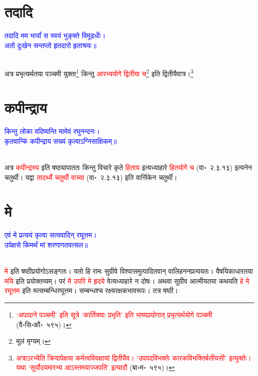 \section[तदादि]{तदादि}
\centering\textcolor{blue}{तदादि मम भार्यां स स्वयं भुङ्क्ते विमूढधीः।\nopagebreak\\
अतो दुःखेन सन्तप्तो हृतदारो हृताश्रयः॥}\nopagebreak\\
\\
\begin{sloppypar}\justifying\noindent\hspace{10mm} अत्र प्रभृत्यर्थतया पञ्चमी युक्ता\footnote{\textcolor{red}{‘अपादाने पञ्चमी’ इति सूत्रे ‘कार्तिक्याः प्रभृति’ इति भाष्य\-प्रयोगात् प्रभृत्यर्थयोगे पञ्चमी} (वै॰सि॰कौ॰~५९५)।} किन्तु \textcolor{red}{आरभ्य\-योगे द्वितीया च}\footnote{मूलं मृग्यम्।} इति द्वितीयैवात्र।\footnote{\textcolor{red}{अत्राऽरभ्येति क्रियापेक्षया कर्मत्वविवक्षायां द्वितीयैव। ‘उपपदविभक्तेः कारकविभक्तिर्बलीयसी’ इत्युक्तेः। यथा ‘सूर्योदयमारभ्य आऽस्तमयाज्जपति’ इत्यादौ} (बा॰म॰~५९५)।}\end{sloppypar}
\section[कपीन्द्राय]{कपीन्द्राय}
\centering\textcolor{blue}{किन्तु लोका वदिष्यन्ति मामेवं रघुनन्दनः।\nopagebreak\\
कृतवान्किं कपीन्द्राय सख्यं कृत्वाऽग्निसाक्षिकम्॥}\nopagebreak\\
\\
\begin{sloppypar}\justifying\noindent\hspace{10mm}
अत्र \textcolor{red}{कपीन्द्रस्य} इति षष्ठ्यापाततः किन्तु विचारे कृते \textcolor{red}{हिताय} इत्यध्याहारे \textcolor{red}{हित\-योगे च} (वा॰~२.३.१३) इत्यनेन चतुर्थी। यद्वा \textcolor{red}{तादर्थ्ये चतुर्थी वाच्या} (वा॰~२.३.१३) इति वार्त्तिकेन चतुर्थी।\end{sloppypar}
\section[मे]{मे}
\centering\textcolor{blue}{एवं मे प्रत्ययं कृत्वा सत्यवादिन् रघूत्तम।\nopagebreak\\
उपेक्षसे किमर्थं मां शरणागतवत्सल॥}\nopagebreak\\
\\
\begin{sloppypar}\justifying\noindent\hspace{10mm} \textcolor{red}{मे} इति षष्ठी\-प्रयोगोऽसङ्गतः। यतो हि रामः सुग्रीवे विश्वासमुत्पादितवान् वालि\-हनन\-प्रत्ययतः। वैषयिकाधारतया \textcolor{red}{मयि} इति प्रयोक्तव्यम्। परं \textcolor{red}{मे उपरि मे हृदये} वेत्यध्याहारे न दोषः। अथवा सुग्रीव आत्मीयतया कथयति \textcolor{red}{हे मे रघूत्तम} इति मत्सम्बन्धि\-रघूत्तम। सम्बन्धश्च रक्ष्य\-रक्षक\-भाव\-रूपः। तत्र षष्ठी।\end{sloppypar}
